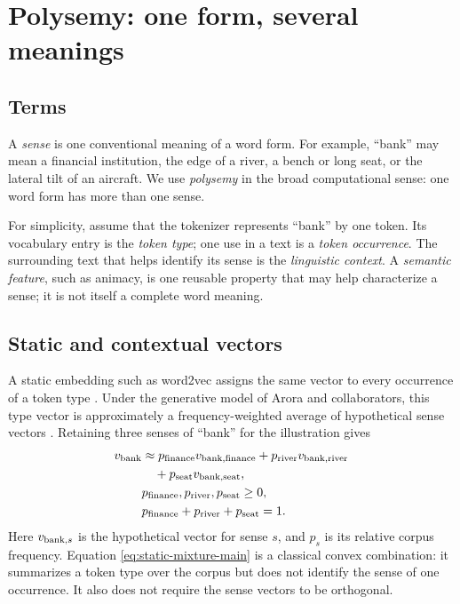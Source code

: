 \documentclass[
  aps,
  reprint,
  superscriptaddress,
  floatfix,
  nofootinbib,
  longbibliography
]{revtex4-2}
\begin{document}
\section{Polysemy: one form, several meanings}
\label{sec:polysemy}

\subsection{Terms}

A \emph{sense} is one conventional meaning of a word form.  For example,
``bank'' may mean a financial institution, the edge of a river, a bench or
long seat, or the lateral tilt of an aircraft.  We use \emph{polysemy} in the
broad computational sense: one word form has more than one sense.

For simplicity, assume that the tokenizer represents ``bank'' by one token.
Its vocabulary entry is the \emph{token type}; one use in a text is a
\emph{token occurrence}.  The surrounding text that helps identify its sense
is the \emph{linguistic context}.  A \emph{semantic feature}, such as animacy,
is one reusable property that may help characterize a sense; it is not itself
a complete word meaning.

\subsection{Static and contextual vectors}

A static embedding such as word2vec assigns the same vector to every
occurrence of a token type \cite{mikolov2013}.  Under the generative model of
Arora and collaborators, this type vector is approximately a
frequency-weighted average of hypothetical sense vectors
\cite{arora-etal-2018-linear}.  Retaining three senses of ``bank'' for the
illustration gives
\begin{equation}
\begin{aligned}
 v_{\rm bank}
 &\approx p_{\rm finance}v_{{\rm bank},{\rm finance}}
 +p_{\rm river}v_{{\rm bank},{\rm river}}\\
 &\quad+p_{\rm seat}v_{{\rm bank},{\rm seat}},\\
 &p_{\rm finance},p_{\rm river},p_{\rm seat}\geq 0,\\
 &p_{\rm finance}+p_{\rm river}+p_{\rm seat}=1 .
\end{aligned}
 \label{eq:static-mixture-main}
\end{equation}
Here $v_{{\rm bank},s}$ is the hypothetical vector for sense $s$, and $p_s$
is its relative corpus frequency.  Equation
\eqref{eq:static-mixture-main} is a classical convex combination: it
summarizes a token type over the corpus but does not identify the sense of one
occurrence.  It also does not require the sense vectors to be orthogonal.
\end{document}
